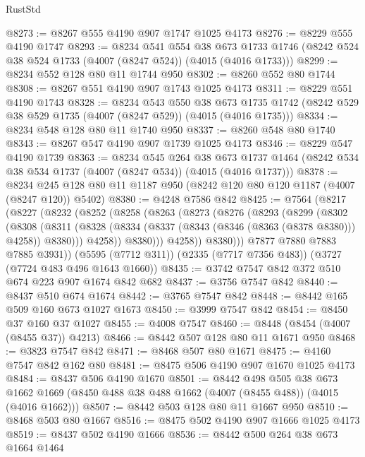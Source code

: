 \begin{lexlean}{RustStd}
\begin{coremodule}
@8273 := @8267 @555 @4190 @907 @1747 @1025 @4173
@8276 := @8229 @555 @4190 @1747
@8293 := @8234
    @541
    @554
    @38
    @673
    @1733
    @1746
    (@8242 @524 @38 @524 @1733 (@4007 (@8247 @524)) (@4015 (@4016 @1733)))
@8299 := @8234 @552 @128 @80 @11 @1744 @950
@8302 := @8260 @552 @80 @1744
@8308 := @8267 @551 @4190 @907 @1743 @1025 @4173
@8311 := @8229 @551 @4190 @1743
@8328 := @8234
    @543
    @550
    @38
    @673
    @1735
    @1742
    (@8242 @529 @38 @529 @1735 (@4007 (@8247 @529)) (@4015 (@4016 @1735)))
@8334 := @8234 @548 @128 @80 @11 @1740 @950
@8337 := @8260 @548 @80 @1740
@8343 := @8267 @547 @4190 @907 @1739 @1025 @4173
@8346 := @8229 @547 @4190 @1739
@8363 := @8234
    @545
    @264
    @38
    @673
    @1737
    @1464
    (@8242 @534 @38 @534 @1737 (@4007 (@8247 @534)) (@4015 (@4016 @1737)))
@8378 := @8234 @245 @128 @80 @11 @1187 @950 (@8242 @120 @80 @120 @1187 (@4007 (@8247 @120)) @5402)
@8380 := @4248 @7586 @842
@8425 := @7564
    (@8217
      (@8227
        (@8232
          (@8252
            (@8258
              (@8263
                (@8273
                  (@8276
                    (@8293
                      (@8299
                        (@8302
                          (@8308
                            (@8311
                              (@8328
                                (@8334 (@8337 (@8343 (@8346 (@8363 (@8378 @8380))) @4258)) @8380)))
                            @4258))
                        @8380)))
                  @4258))
              @8380)))
        @7877
        @7880
        @7883
        @7885
        @3931))
    (@5595 (@7712 @311))
    (@2335 (@7717 @7356 @483))
    (@3727 (@7724 @483 @496 @1643 @1660))
@8435 := @3742 @7547 @842 @372 @510 @674 @223 @907 @1674 @842 @682
@8437 := @3756 @7547 @842
@8440 := @8437 @510 @674 @1674
@8442 := @3765 @7547 @842
@8448 := @8442 @165 @509 @160 @673 @1027 @1673
@8450 := @3999 @7547 @842
@8454 := @8450 @37 @160 @37 @1027
@8455 := @4008 @7547
@8460 := @8448 (@8454 (@4007 (@8455 @37)) @4213)
@8466 := @8442 @507 @128 @80 @11 @1671 @950
@8468 := @3823 @7547 @842
@8471 := @8468 @507 @80 @1671
@8475 := @4160 @7547 @842 @162 @80
@8481 := @8475 @506 @4190 @907 @1670 @1025 @4173
@8484 := @8437 @506 @4190 @1670
@8501 := @8442
    @498
    @505
    @38
    @673
    @1662
    @1669
    (@8450 @488 @38 @488 @1662 (@4007 (@8455 @488)) (@4015 (@4016 @1662)))
@8507 := @8442 @503 @128 @80 @11 @1667 @950
@8510 := @8468 @503 @80 @1667
@8516 := @8475 @502 @4190 @907 @1666 @1025 @4173
@8519 := @8437 @502 @4190 @1666
@8536 := @8442
    @500
    @264
    @38
    @673
    @1664
    @1464

\end{coremodule}
\end{lexlean}
